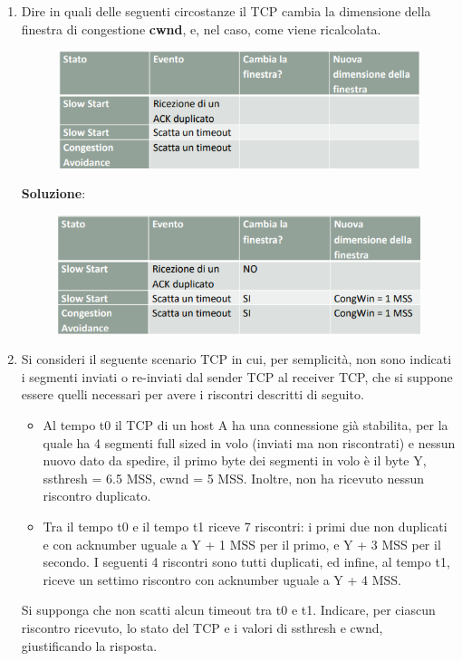 \documentclass[11pt,a4paper,oneside]{book}
\theoremstyle{definition}
\begin{document}
\begin{enumerate}
	\item Dire in quali delle seguenti circostanze il TCP cambia la dimensione della
	      finestra di congestione \textbf{cwnd}, e, nel caso, come viene ricalcolata.
	      \begin{figure}[!h]
		      \includegraphics[scale=0.5]{Immagini/Es5_1.png}
		      \centering
	      \end{figure}
	      \begin{flushleft}
		      \textbf{Soluzione}:
	      \end{flushleft}
	      \begin{figure}[!h]
		      \includegraphics[scale=0.5]{Immagini/Es5_2.png}
		      \centering
	      \end{figure}
	\item Si consideri il seguente scenario TCP in cui, per semplicità, non sono
	      indicati i segmenti inviati o re-inviati dal sender TCP al receiver TCP, che si
	      suppone essere quelli necessari per avere i riscontri descritti di seguito.
	      \begin{itemize}
		      \item Al tempo t0 il TCP di un host A ha una connessione già stabilita, per la
		            quale ha 4 segmenti full sized in volo (inviati ma non riscontrati) e nessun
		            nuovo dato da spedire, il primo byte dei segmenti in volo è il byte Y,
		            ssthresh = 6.5 MSS, cwnd = 5 MSS. Inoltre, non ha ricevuto nessun riscontro
		            duplicato.
		      \item Tra il tempo t0 e il tempo t1 riceve 7 riscontri: i primi due non duplicati e
		            con acknumber uguale a Y + 1 MSS per il primo, e Y + 3 MSS per il secondo. I
		            seguenti 4 riscontri sono tutti duplicati, ed infine, al tempo t1, riceve un
		            settimo riscontro con acknumber uguale a Y + 4 MSS.
	      \end{itemize}
	      Si supponga che non scatti alcun timeout tra t0 e t1. Indicare, per ciascun riscontro ricevuto, lo stato del TCP e i valori di ssthresh e cwnd, giustificando la risposta.


\end{enumerate}
\end{document}
